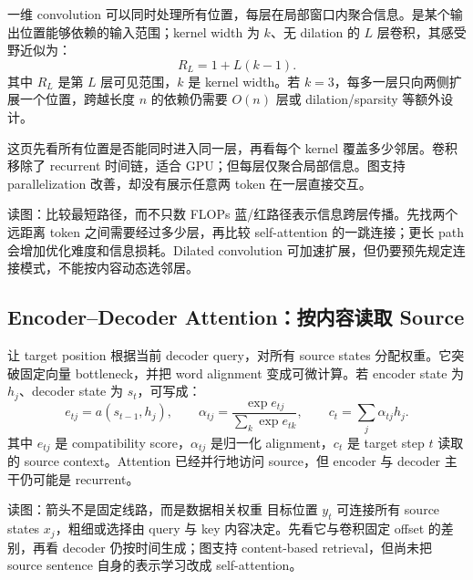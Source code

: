 一维 convolution 可以同时处理所有位置，每层在局部窗口内聚合信息。是某个输出位置能够依赖的输入范围；kernel width 为 $k$、无 dilation 的 $L$ 层卷积，其感受野近似为：
\[
R_L=1+L(k-1).
\]
其中 $R_L$ 是第 $L$ 层可见范围，$k$ 是 kernel width。若 $k=3$，每多一层只向两侧扩展一个位置，跨越长度 $n$ 的依赖仍需要 $O(n)$ 层或 dilation/sparsity 等额外设计。


这页先看所有位置是否能同时进入同一层，再看每个 kernel 覆盖多少邻居。卷积移除了 recurrent 时间链，适合 GPU；但每层仅聚合局部信息。图支持 parallelization 改善，却没有展示任意两 token 在一层直接交互。


\begin{knowledgebox}{读图：比较最短路径，而不只数 FLOPs}
蓝/红路径表示信息跨层传播。先找两个远距离 token 之间需要经过多少层，再比较 self-attention 的一跳连接；更长 path 会增加优化难度和信息损耗。Dilated convolution 可加速扩展，但仍要预先规定连接模式，不能按内容动态选邻居。
\end{knowledgebox}

\subsection{Encoder--Decoder Attention：按内容读取 Source}

让 target position 根据当前 decoder query，对所有 source states 分配权重。它突破固定向量 bottleneck，并把 word alignment 变成可微计算。若 encoder state 为 $h_j$、decoder state 为 $s_t$，可写成：
\[
e_{tj}=a(s_{t-1},h_j),\qquad
\alpha_{tj}=\frac{\exp e_{tj}}{\sum_{k}\exp e_{tk}},\qquad
c_t=\sum_j\alpha_{tj}h_j.
\]
其中 $e_{tj}$ 是 compatibility score，$\alpha_{tj}$ 是归一化 alignment，$c_t$ 是 target step $t$ 读取的 source context。Attention 已经并行地访问 source，但 encoder 与 decoder 主干仍可能是 recurrent。


\begin{knowledgebox}{读图：箭头不是固定线路，而是数据相关权重}
目标位置 $y_t$ 可连接所有 source states $x_j$，粗细或选择由 query 与 key 内容决定。先看它与卷积固定 offset 的差别，再看 decoder 仍按时间生成；图支持 content-based retrieval，但尚未把 source sentence 自身的表示学习改成 self-attention。
\end{knowledgebox}

